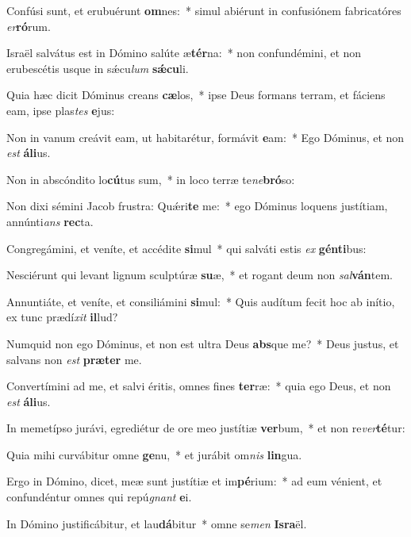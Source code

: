 \item Confúsi sunt, et erubuérunt \textbf{om}nes:~* simul abiérunt in confusiónem fabricatóres \textit{er}\textbf{ró}rum.
\item Israël salvátus est in Dómino salúte æ\textbf{tér}na:~* non confundémini, et non erubescétis usque in sǽcu\textit{lum} \textbf{sǽ}\textbf{cu}li.
\item Quia hæc dicit Dóminus creans \textbf{cæ}los,~* ipse Deus formans terram, et fáciens eam, ipse plas\textit{tes} \textbf{e}jus:
\item Non in vanum creávit eam, ut habitarétur, formávit \textbf{e}am:~* Ego Dóminus, et non \textit{est} \textbf{á}\textbf{li}us.
\item Non in abscóndito lo\textbf{cú}tus sum,~* in loco terræ te\textit{ne}\textbf{bró}so:
\item Non dixi sémini Jacob frustra: Quǽri\textbf{te} me:~* ego Dóminus loquens justítiam, annúnti\textit{ans} \textbf{rec}ta.
\item Congregámini, et veníte, et accédite \textbf{si}mul~* qui salváti estis \textit{ex} \textbf{gén}\textbf{ti}bus:
\item Nesciérunt qui levant lignum sculptúræ \textbf{su}æ,~* et rogant deum non \textit{sal}\textbf{ván}tem.
\item Annuntiáte, et veníte, et consiliámini \textbf{si}mul:~* Quis audítum fecit hoc ab inítio, ex tunc prædí\textit{xit} \textbf{il}lud?
\item Numquid non ego Dóminus, et non est ultra Deus \textbf{abs}que me?~* Deus justus, et salvans non \textit{est} \textbf{præ}\textbf{ter} me.
\item Convertímini ad me, et salvi éritis, omnes fines \textbf{ter}ræ:~* quia ego Deus, et non \textit{est} \textbf{á}\textbf{li}us.
\item In memetípso jurávi, egrediétur de ore meo justítiæ \textbf{ver}bum,~* et non re\textit{ver}\textbf{té}tur:
\item Quia mihi curvábitur omne \textbf{ge}nu,~* et jurábit om\textit{nis} \textbf{lin}gua.
\item Ergo in Dómino, dicet, meæ sunt justítiæ et im\textbf{pé}rium:~* ad eum vénient, et confundéntur omnes qui repú\textit{gnant} \textbf{e}i.
\item In Dómino justificábitur, et lau\textbf{dá}bitur~* omne se\textit{men} \textbf{Is}\textbf{ra}ël.
